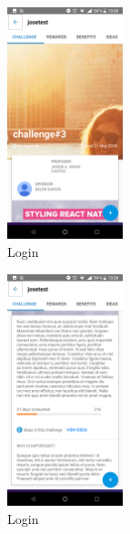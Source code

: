 \begin{figure}[!h]
	\begin{center}
		\includegraphics[width=0.3\textwidth]{./img/anexo1/ver_desafio_inicio.png}
		\caption{Login}
		\label{fig:ver_desafio_inicio}
	\end{center}
\end{figure}

\begin{figure}[!h]
	\begin{center}
		\includegraphics[width=0.3\textwidth]{./img/anexo1/ver_desafio_inicio_cont.png}
		\caption{Login}
		\label{fig:ver_desafio_inicio_cont}
	\end{center}
\end{figure}


